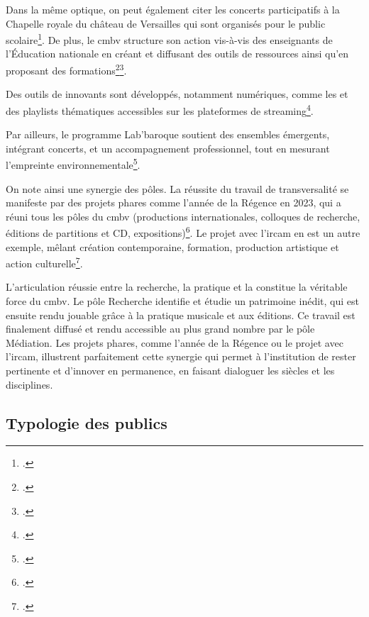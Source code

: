 Dans la même optique, on peut également citer les concerts participatifs à la Chapelle royale du château de Versailles qui sont organisés pour le public scolaire\footcite{centredemusiquebaroquedeversaillesRapportActivite2023}. De plus, le \gls{cmbv} structure son action vis-à-vis des enseignants de l'Éducation nationale en créant et diffusant des outils de ressources ainsi qu'en proposant des formations\footcite{centredemusiquebaroquedeversaillesProjetEtablissement2022}\footcite{centredemusiquebaroquedeversaillesRapportActivite2023}.

Des outils de  innovants sont développés, notamment numériques, comme les  et des playlists thématiques accessibles sur les plateformes de streaming\footcite{centredemusiquebaroquedeversaillesProjetEtablissement2022}.

Par ailleurs, le programme Lab'baroque soutient des ensembles émergents, intégrant concerts,  et un accompagnement professionnel, tout en mesurant l'empreinte environnementale\footcite{centredemusiquebaroquedeversaillesRapportActivite2023}.

On note ainsi une synergie des pôles. La réussite du travail de transversalité se manifeste par des projets phares comme l'année de la Régence en 2023, qui a réuni tous les pôles du \gls{cmbv} (productions internationales, colloques de recherche, éditions de partitions et CD, expositions)\footcite{centredemusiquebaroquedeversaillesRapportActivite2023}. Le projet  avec l'\gls{ircam} en est un autre exemple, mêlant création contemporaine, formation, production artistique et action culturelle\footcite{centredemusiquebaroquedeversaillesRapportActivite2023}.

L'articulation réussie entre la recherche, la pratique et la  constitue la véritable force du \gls{cmbv}. Le pôle Recherche identifie et étudie un patrimoine inédit, qui est ensuite rendu jouable grâce à la pratique musicale et aux éditions. Ce travail est finalement diffusé et rendu accessible au plus grand nombre par le pôle Médiation. Les projets phares, comme l'année de la Régence ou le projet  avec l'\gls{ircam}, illustrent parfaitement cette synergie qui permet à l'institution de rester pertinente et d'innover en permanence, en faisant dialoguer les siècles et les disciplines.

\subsection{Typologie des publics}

